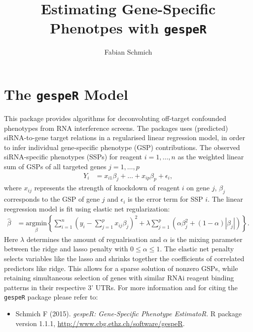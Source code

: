 \documentclass{article}\usepackage[]{graphicx}\usepackage[]{color}
\begin{document}
\title{Estimating Gene-Specific Phenotpes with \texttt{gespeR}}
\author{Fabian Schmich}

\maketitle
\tableofcontents

\section{The \texttt{gespeR} Model}
This package provides algorithms for deconvoluting off-target confounded phenotypes from RNA interference screens. The packages uses (predicted) siRNA-to-gene target relations in a regularised linear regression model, in order to infer individual gene-specific phenotype (GSP) contributions. The observed siRNA-specific phenotypes (SSPs) for reagent $i = 1,\ldots,n$ as the weighted linear sum of GSPs of all targeted genes $j = 1,\ldots,p$
\begin{align}
Y_i &= x_{i1}\beta_j + \ldots + x_{ip}\beta_p + \epsilon_i,
\end{align}
where $x_{ij}$ represents the strength of knockdown of reagent $i$ on gene $j$, $\beta_j$ corresponds to the GSP of gene $j$ and $\epsilon_i$ is the error term for SSP $i$. The linear reegression model is fit using elastic net regularization:
\begin{align}
\hat{\beta} &= \underset{\beta}{\text{argmin}} \left\{ \sum_{i=1}^n \left( y_i - \sum_{j=1}^p x_{ij}\beta_j \right)^2 + \lambda \sum_{j=1}^p \left(  \alpha\beta_j^2 + \left(1 - \alpha \right) |\beta_j| \right) \right\}.
\end{align}
Here $\lambda$ determines the amount of regualrisation and $\alpha$ is the mixing parameter between the ridge and lasso penalty with $0 \leq \alpha \leq 1$. The elastic net penalty selects variables like the lasso and shrinks together the coefficients of correlated predictors like ridge. This allows for a sparse solution of nonzero GSPs, while retaining simultaneous selection of genes with similar RNAi reagent binding patterns in their respective 3' UTRs. For more information and for citing the \texttt{gespeR} package please refer to:
\begin{itemize}
\item[]
Schmich F (2015).
\emph{gespeR: Gene-Specific Phenotype EstimatoR}.
R package version 1.1.1, \url{http://www.cbg.ethz.ch/software/gespeR}.

\end{itemize}
\end{document}
